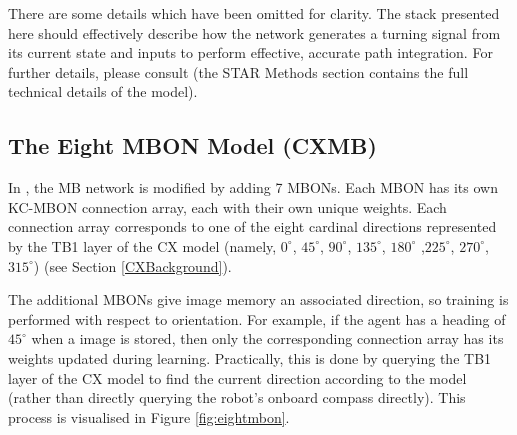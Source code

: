 \documentclass[a4paper,11pt,twoside,openright]{article}
\begin{document}
There are some details which have been omitted for clarity. The stack
presented here should effectively describe how the network generates a
turning signal from its current state and inputs to perform effective,
accurate path integration. For further details, please consult
\cite{Stone2017} (the STAR Methods section contains the full technical
details of the model).

\subsection{ The Eight MBON Model (CXMB) } \label{CXMBBackground}
In \cite{Zhang2017}, the MB network is modified by adding 7 MBONs. Each MBON has
its own KC-MBON connection array, each with their own unique weights. Each
connection array corresponds to one of the eight cardinal directions represented
by the TB1 layer of the CX model (namely, $0^{\circ}$, $45^{\circ}$,
$90^{\circ}$, $135^{\circ}$, $180^{\circ}$ ,$225^{\circ}$, $270^{\circ}$,
$315^{\circ}$) (see Section \ref{CXBackground}).
\newline
\par

The additional MBONs give image memory an associated direction, so
training is performed with respect to orientation. For example, if the
agent has a heading of $45^{\circ}$ when a image is stored, then only
the corresponding connection array has its weights updated during
learning. Practically, this is done by querying the TB1 layer of the
CX model to find the current direction according to the model (rather
than directly querying the robot's onboard compass directly). This
process is visualised in Figure \ref{fig:eightmbon}.
\newline
\par
\end{document}

